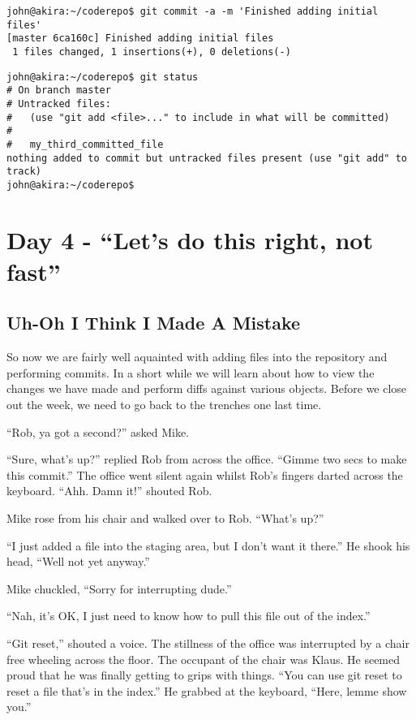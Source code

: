 \begin{Verbatim}[frame=single,fontsize=\relsize{-3}] 
john@akira:~/coderepo$ git commit -a -m 'Finished adding initial files' 
[master 6ca160c] Finished adding initial files 
 1 files changed, 1 insertions(+), 0 deletions(-) 
\end{Verbatim} 

\begin{Verbatim}[frame=single,fontsize=\relsize{-3}] 
john@akira:~/coderepo$ git status 
# On branch master 
# Untracked files: 
#   (use "git add <file>..." to include in what will be committed) 
# 
#	my_third_committed_file 
nothing added to commit but untracked files present (use "git add" to track) 
john@akira:~/coderepo$ 
\end{Verbatim} 

\section{Day 4 - ``Let's do this right, not fast''}

\subsection{Uh-Oh I Think I Made A Mistake}

So now we are fairly well aquainted with adding files into the repository and performing commits.  In a short while we will learn about how to view the changes we have made and perform diffs against various objects.  Before we close out the week, we need to go back to the trenches one last time.

\begin{trenches}
``Rob, ya got a second?'' asked Mike.

``Sure, what's up?'' replied Rob from across the office.  ``Gimme two secs to make this commit.''  The office went silent again whilst Rob's fingers darted across the keyboard.  ``Ahh.  Damn it!'' shouted Rob.  

Mike rose from his chair and walked over to Rob.  ``What's up?''

``I just added a file into the staging area, but I don't want it there.''  He shook his head, ``Well not yet anyway.''

Mike chuckled, ``Sorry for interrupting dude.''

``Nah, it's OK, I just need to know how to pull this file out of the index.''

``Git reset,'' shouted a voice.  The stillness of the office was interrupted by a chair free wheeling across the floor.  The occupant of the chair was Klaus.  He seemed proud that he was finally getting to grips with things.  ``You can use git reset to reset a file that's in the index.''  He grabbed at the keyboard, ``Here, lemme show you.''
\end{trenches}

